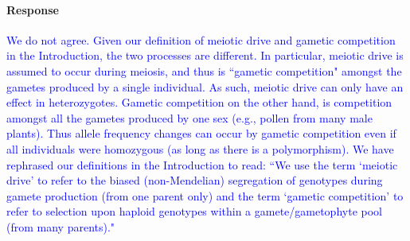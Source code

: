 \documentclass[10pt,letterpaper]{article}
\begin{document}
\noindent\paragraph{Response}
\textcolor{blue}{We do not agree. 
Given our definition of meiotic drive and gametic competition in the Introduction, the two processes are different.
In particular, meiotic drive is assumed to occur during meiosis, and thus is ``gametic competition" amongst the gametes produced by a single individual. 
As such, meiotic drive can only have an effect in heterozygotes.
Gametic competition on the other hand, is competition amongst all the gametes produced by one sex (e.g., pollen from many male plants).
Thus allele frequency changes can occur by gametic competition even if all individuals were homozygous (as long as there is a polymorphism).
We have rephrased our definitions in the Introduction to read: ``We use the term `meiotic drive' to refer to the biased (non-Mendelian) segregation of genotypes during gamete production (from one parent only) and the term `gametic competition' to refer to selection upon haploid genotypes within a gamete/gametophyte pool (from many parents)."
}
\end{document}
